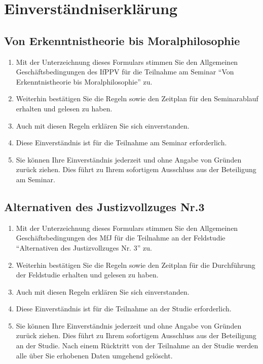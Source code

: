 \documentclass[a4paper, 12pt]{scrartcl}
\begin{document}
  \section{Einverst\"andniserkl\"arung}

  \subsection{Von Erkenntnistheorie bis Moralphilosophie}

  \begin{enumerate}
    \item Mit der Unterzeichnung dieses Formulars stimmen Sie den Allgemeinen Gesch\"aftsbedingungen des IfPPV f\"ur die Teilnahme am Seminar \enquote{Von Erkenntnistheorie bis Moralphilosophie} zu.
    \item Weiterhin best\"atigen Sie die Regeln sowie den Zeitplan f\"ur den Seminarablauf erhalten und gelesen zu haben.
    \item Auch mit diesen Regeln erkl\"aren Sie sich einverstanden.
    \item Diese Einverst\"andnis ist f\"ur die Teilnahme am Seminar erforderlich.
    \item Sie k\"onnen Ihre Einverst\"andnis jederzeit und ohne Angabe von Gr\"unden zur\"uck ziehen. Dies f\"uhrt zu Ihrem sofortigem Ausschluss aus der Beteiligung am Seminar.
  \end{enumerate}

  \subsection{Alternativen des Justizvollzuges Nr.3}

  \begin{enumerate}
    \item Mit der Unterzeichnung dieses Formulars stimmen Sie den Allgemeinen Gesch\"aftsbedingungen des MfJ f\"ur die Teilnahme an der Feldstudie \enquote{Alternativen des Justizvollzuges Nr. 3} zu.
    \item Weiterhin best\"atigen Sie die Regeln sowie den Zeitplan f\"ur die Durchf\"uhrung der Feldstudie erhalten und gelesen zu haben.
    \item Auch mit diesen Regeln erkl\"aren Sie sich einverstanden.
    \item Diese Einverst\"andnis ist f\"ur die Teilnahme an der Studie erforderlich.
    \item Sie k\"onnen Ihre Einverst\"andnis jederzeit und ohne Angabe von Gr\"unden zur\"uck ziehen. Dies f\"uhrt zu Ihrem sofortigem Ausschluss aus der Beteiligung an der Studie. Nach einem R\"ucktritt von der Teilnahme an der Studie werden alle \"uber Sie erhobenen Daten umgehend gel\"oscht.
  \end{enumerate}
\end{document}
